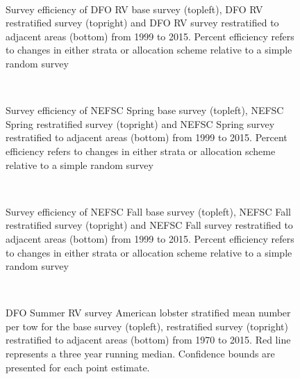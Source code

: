 \documentclass[11pt]{article}
\newcommand{\e}{/backup/bio_data/bio.lobster/figures/}
\begin{document}
\begin{figure}
\centering
{}
\\
\caption{Survey efficiency of DFO RV base survey (topleft), DFO RV restratified survey (topright) and DFO RV survey restratified to adjacent areas (bottom) from 1999 to 2015. Percent efficiency refers to changes in either strata or allocation scheme relative to a simple random survey }
\end{figure}
\clearpage



\begin{figure}
\centering
{}
\\
\caption{Survey efficiency of NEFSC Spring base survey (topleft), NEFSC Spring restratified survey (topright) and NEFSC Spring survey restratified to adjacent areas (bottom) from 1999 to 2015. Percent efficiency refers to changes in either strata or allocation scheme relative to a simple random survey }
\end{figure}
\clearpage


\begin{figure}
\centering
{}
\\
\caption{Survey efficiency of NEFSC Fall base survey (topleft), NEFSC Fall restratified survey (topright) and NEFSC Fall survey restratified to adjacent areas (bottom) from 1999 to 2015. Percent efficiency refers to changes in either strata or allocation scheme relative to a simple random survey }
\end{figure}
\clearpage

\begin{figure}
\centering
{}
\\
\caption{DFO Summer RV survey American lobster stratified mean number per tow for the base survey (topleft), restratified survey (topright) restratified to adjacent areas (bottom) from 1970 to 2015. Red line represents a three year running median. Confidence bounds are presented for each point estimate. }
\end{figure}
\clearpage
\end{document}
